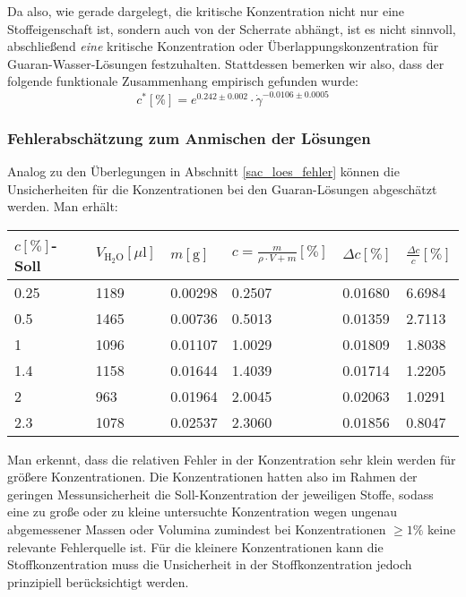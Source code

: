 \documentclass[11pt,a4paper,oneside]{scrartcl}
\begin{document}
Da also, wie gerade dargelegt, die kritische Konzentration nicht nur eine Stoffeigenschaft ist, sondern auch von der Scherrate abhängt, ist es nicht sinnvoll, abschließend \emph{eine} kritische Konzentration oder Überlappungskonzentration für Guaran-Wasser-Lösungen festzuhalten. Stattdessen bemerken wir also, dass der folgende funktionale Zusammenhang empirisch gefunden wurde:
\begin{equation}
c^*[\%]=e^{0.242\pm0.002}\cdot\dot\gamma^{-0.0106\pm0.0005}
\end{equation}


\subsubsection{Fehlerabschätzung zum Anmischen der Lösungen}
Analog zu den Überlegungen in Abschnitt \ref{sac_loes_fehler} können die Unsicherheiten für die Konzentrationen bei den Guaran-Lösungen abgeschätzt werden. Man erhält:
\begin{table}[!ht]
    \centering
    \begin{tabular}{llllll}
    \hline
        $c [\%]$-Soll & $V_{\mathrm{H_2O}} [\mu \mathrm l]$ & $m [\mathrm g]$ & $c=\frac{m}{\rho\cdot V+m}[\%]$ & $\Delta c[\%]$ & $\frac{\Delta c}{c}[\%]$ \\ \hline
             0.25 & 1189 & 0.00298 & 0.2507 & 0.01680 & 6.6984 \\ 
        0.5 & 1465 & 0.00736 & 0.5013 & 0.01359 & 2.7113 \\ 
        1 & 1096 & 0.01107 & 1.0029 & 0.01809 & 1.8038 \\ 
        1.4 & 1158 & 0.01644 & 1.4039 & 0.01714 & 1.2205 \\ 
        2 & 963 & 0.01964 & 2.0045 & 0.02063 & 1.0291 \\ 
        2.3 & 1078 & 0.02537 & 2.3060 & 0.01856 & 0.8047 \\  \hline
    \end{tabular}
\end{table}
Man erkennt, dass die relativen Fehler in der Konzentration sehr klein werden für größere Konzentrationen. Die Konzentrationen hatten also im Rahmen der geringen Messunsicherheit die Soll-Konzentration der jeweiligen Stoffe, sodass eine zu große oder zu kleine untersuchte Konzentration wegen ungenau abgemessener Massen oder Volumina zumindest bei Konzentrationen $\geq 1\%$ keine relevante Fehlerquelle ist. Für die kleinere Konzentrationen kann die Stoffkonzentration muss die Unsicherheit in der Stoffkonzentration jedoch prinzipiell berücksichtigt werden.
\end{document}
